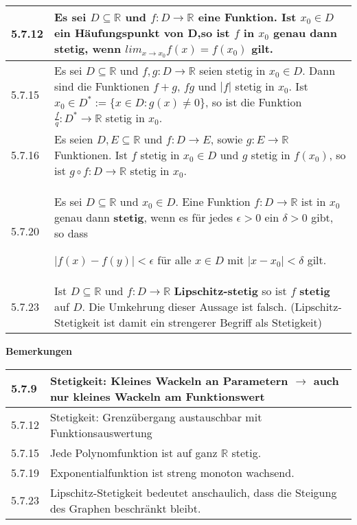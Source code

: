    \begin{longtable}{p{1cm} p{16cm}}
        \toprule

        5.7.12& Es sei $D \subseteq \mathbb{R}$ und $f : D \rightarrow \mathbb{R}$ eine Funktion. Ist $x_0 \in D$ ein Häufungspunkt
                von D,so ist $f$ in $x_0$ genau dann \textbf{stetig}, wenn $lim_{x \rightarrow x_0} f(x) = f(x_0)$ gilt. \\
        \midrule
        5.7.15& Es sei $D \subseteq \mathbb{R}$ und $f,g : D \rightarrow \mathbb{R}$ seien stetig in $x_0 \in D$. Dann sind die
                Funktionen $f+g$, $fg$ und $|f|$ stetig in $x_0$. \hfill \break
                Ist $x_0 \in D^* := \{ x \in D: g(x) \neq 0\}$, so ist die Funktion $\frac{f}{q}:D^* \rightarrow \mathbb{R}$ stetig in $x_0$.\\
        \midrule
        5.7.16& Es seien $D,E \subseteq \mathbb{R}$ und $f: D \rightarrow E$, sowie $g: E \rightarrow \mathbb{R}$ Funktionen. Ist $f$ 
                stetig in $x_0 \in D$ und $g$ stetig in $f(x_0)$, so ist $g \circ f: D \rightarrow \mathbb{R}$ stetig in $x_0$. \\ 
        \midrule
        5.7.20& Es sei $D \subseteq \mathbb{R}$ und $x_0 \in D$. Eine Funktion $f: D \rightarrow \mathbb{R}$ ist in $x_0$ genau dann
                \textbf{stetig}, wenn es für jedes $\epsilon > 0$ ein $\delta > 0$ gibt, so dass \hfill \break
                \centerline{$|f(x) - f(y)| < \epsilon$ für alle $x \in D$ mit $|x-x_0|<\delta$ gilt.} \\
        \midrule
        5.7.23& Ist $D \subseteq \mathbb{R}$ und $f:D \rightarrow \mathbb{R}$ \textbf{Lipschitz-stetig} so ist $f$ \textbf{stetig} auf $D$.
                Die Umkehrung dieser Aussage ist falsch. (Lipschitz-Stetigkeit ist damit ein strengerer Begriff als Stetigkeit) \\
        \bottomrule
    \end{longtable}
    

    

    \noindent
    \textbf{Bemerkungen}
    
    \begin{longtable}{p{1cm} p{16cm}}
        \toprule

        5.7.9 & Stetigkeit: Kleines Wackeln an Parametern $\rightarrow$ auch nur kleines Wackeln am Funktionswert \\
        \midrule
        5.7.12& Stetigkeit: Grenzübergang austauschbar mit Funktionsauswertung \\
        \midrule
        5.7.15& Jede Polynomfunktion ist auf ganz $\mathbb{R}$ stetig. \\
        \midrule
        5.7.19& Exponentialfunktion ist streng monoton wachsend. \\
        \midrule
        5.7.23& Lipschitz-Stetigkeit bedeutet anschaulich, dass die Steigung des Graphen beschränkt bleibt. \\

        \bottomrule
    \end{longtable}
    

